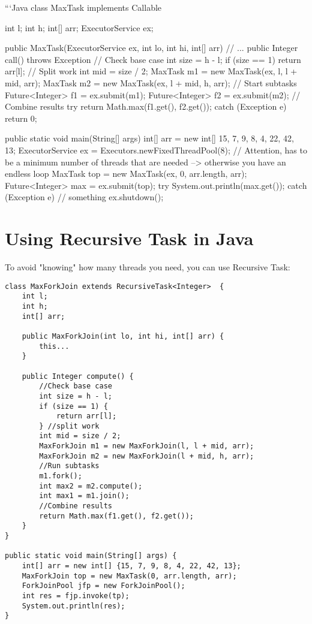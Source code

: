 \documentclass{article}
\begin{document}
```Java
class MaxTask implements Callable  {
    int l;
    int h;
    int[] arr;
    ExecutorService ex;

    public MaxTask(ExecutorService ex, int lo, int hi, int[] arr) {
       // ...
    }
    public Integer call() throws Exception {
        // Check base case
        int size = h - l;
        if (size == 1) {
            return arr[l];
        }
        // Split work
        int mid = size / 2;
        MaxTask m1 = new MaxTask(ex, l, l + mid, arr);
        MaxTask m2 = new MaxTask(ex, l + mid, h, arr);
        // Start subtasks
        Future<Integer> f1 = ex.submit(m1);
        Future<Integer> f2 = ex.submit(m2);
        // Combine results
        try {
            return Math.max(f1.get(), f2.get());
        } catch (Exception e) {
            return 0;
        }
    }
}

public static void main(String[] args) {
    int[] arr = new int[] {15, 7, 9, 8, 4, 22, 42, 13};
    ExecutorService ex = Executors.newFixedThreadPool(8); // Attention, has to be a minimum number of threads that are needed --> otherwise you have an endless loop
    MaxTask top = new MaxTask(ex, 0, arr.length, arr);
    Future<Integer> max = ex.submit(top);
    try {
        System.out.println(max.get());
    } catch (Exception e) {
        // something
    }
    ex.shutdown();
}


\section{Using Recursive Task in Java}
To avoid "knowing" how many threads you need, you can use Recursive Task:

\begin{lstlisting}[style=java]
class MaxForkJoin extends RecursiveTask<Integer>  {
    int l;
    int h;
    int[] arr;

    public MaxForkJoin(int lo, int hi, int[] arr) {
        this...
    }

    public Integer compute() {
        //Check base case
        int size = h - l;
        if (size == 1) {
            return arr[l];
        } //split work
        int mid = size / 2;
        MaxForkJoin m1 = new MaxForkJoin(l, l + mid, arr);
        MaxForkJoin m2 = new MaxForkJoin(l + mid, h, arr);
        //Run subtasks
        m1.fork();
        int max2 = m2.compute();
        int max1 = m1.join();
        //Combine results
        return Math.max(f1.get(), f2.get());
    }
}

public static void main(String[] args) {
    int[] arr = new int[] {15, 7, 9, 8, 4, 22, 42, 13};
    MaxForkJoin top = new MaxTask(0, arr.length, arr);
    ForkJoinPool jfp = new ForkJoinPool();
    int res = fjp.invoke(tp);
    System.out.println(res);
}
\end{lstlisting}
\end{document}
